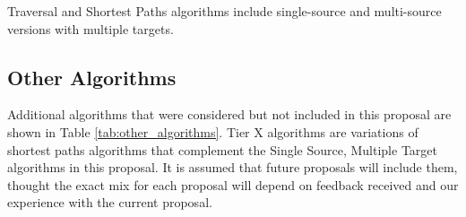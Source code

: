 Traversal and Shortest Paths algorithms include single-source and multi-source versions with multiple targets.

\subsection{Other Algorithms}
Additional algorithms that were considered but not included in this proposal are shown in Table \ref{tab:other_algorithms}. 
Tier X algorithms are variations of shortest paths algorithms that complement the Single Source, Multiple Target algorithms 
in this proposal.
It is assumed that future proposals will include them, thought the exact mix for each proposal will depend on feedback received
and our experience with the current proposal.


